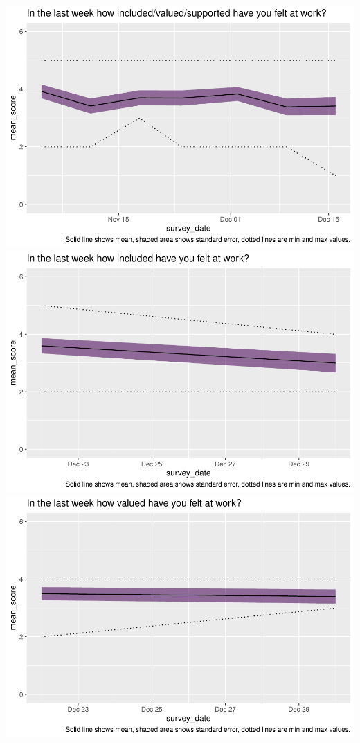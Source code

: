 \documentclass[
  10pt,
]{article}
\begin{document}
\includegraphics{../pdf/Report_files/figure-latex/likert-4.pdf}
\includegraphics{../pdf/Report_files/figure-latex/likert-5.pdf}
\includegraphics{../pdf/Report_files/figure-latex/likert-6.pdf}
\end{document}
